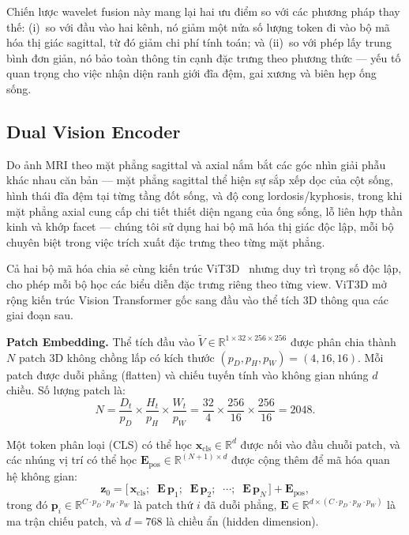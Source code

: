 Chiến lược wavelet fusion này mang lại hai ưu điểm so với các phương pháp thay thế: (i)~so với đầu vào hai kênh, nó giảm một nửa số lượng token đi vào bộ mã hóa thị giác sagittal, từ đó giảm chi phí tính toán; và (ii)~so với phép lấy trung bình đơn giản, nó bảo toàn thông tin cạnh đặc trưng theo phương thức --- yếu tố quan trọng cho việc nhận diện ranh giới đĩa đệm, gai xương và biên hẹp ống sống.


\subsection{Dual Vision Encoder}

Do ảnh MRI theo mặt phẳng sagittal và axial nắm bắt các góc nhìn giải phẫu khác nhau căn bản --- mặt phẳng sagittal thể hiện sự sắp xếp dọc của cột sống, hình thái đĩa đệm tại từng tầng đốt sống, và độ cong lordosis/kyphosis, trong khi mặt phẳng axial cung cấp chi tiết thiết diện ngang của ống sống, lỗ liên hợp thần kinh và khớp facet --- chúng tôi sử dụng hai bộ mã hóa thị giác độc lập, mỗi bộ chuyên biệt trong việc trích xuất đặc trưng theo từng mặt phẳng.

Cả hai bộ mã hóa chia sẻ cùng kiến trúc ViT3D~\cite{dosovitskiy2021image} nhưng duy trì trọng số độc lập, cho phép mỗi bộ học các biểu diễn đặc trưng riêng theo từng view. ViT3D mở rộng kiến trúc Vision Transformer gốc sang đầu vào thể tích 3D thông qua các giai đoạn sau.

\textbf{Patch Embedding.} Thể tích đầu vào $\tilde{V} \in \mathbb{R}^{1 \times 32 \times 256 \times 256}$ được phân chia thành~$N$ patch 3D không chồng lấp có kích thước $(p_D, p_H, p_W) = (4, 16, 16)$. Mỗi patch được duỗi phẳng (flatten) và chiếu tuyến tính vào không gian nhúng $d$ chiều. Số lượng patch là:
\begin{equation}
N = \frac{D_t}{p_D} \times \frac{H_t}{p_H} \times \frac{W_t}{p_W} = \frac{32}{4} \times \frac{256}{16} \times \frac{256}{16} = 2048.
\label{eq:num_patches}
\end{equation}

Một token phân loại (CLS) có thể học $\mathbf{x}_{\text{cls}} \in \mathbb{R}^{d}$ được nối vào đầu chuỗi patch, và các nhúng vị trí có thể học $\mathbf{E}_{\text{pos}} \in \mathbb{R}^{(N+1) \times d}$ được cộng thêm để mã hóa quan hệ không gian:
\begin{equation}
\mathbf{z}_0 = \big[\, \mathbf{x}_{\text{cls}} ;\;\; \mathbf{E}\,\mathbf{p}_1 ;\;\; \mathbf{E}\,\mathbf{p}_2 ;\;\; \cdots ;\;\; \mathbf{E}\,\mathbf{p}_N \,\big] + \mathbf{E}_{\text{pos}},
\label{eq:patch_embed}
\end{equation}
trong đó $\mathbf{p}_i \in \mathbb{R}^{C \cdot p_D \cdot p_H \cdot p_W}$ là patch thứ $i$ đã duỗi phẳng, $\mathbf{E} \in \mathbb{R}^{d \times (C \cdot p_D \cdot p_H \cdot p_W)}$ là ma trận chiếu patch, và $d = 768$ là chiều ẩn (hidden dimension).


